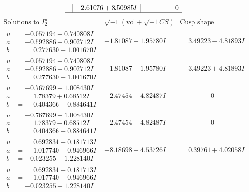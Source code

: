 \documentclass[1p]{elsarticle_modified}
\theoremstyle{definition}
\newcommand{\I}{\sqrt{-1}}
\begin{document}
$$\begin{array}{c|c|c}
 & \phantom{-}2.61076 + 8.50985 I & \phantom{-0.000000 } 0\\
 \hline 
 \end{array}$$\newpage$$\begin{array}{c|c|c}  
\text{Solutions to }I^u_{2}& \I (\text{vol} + \sqrt{-1}CS) & \text{Cusp shape}\\
 \hline 
\begin{aligned}
u &= -0.057194 + 0.740808 I \\
a &= -0.592886 - 0.902712 I \\
b &= \phantom{-}0.277630 + 1.001670 I\end{aligned}
 & -1.81087 + 1.95780 I & \phantom{-}3.49223 - 4.81893 I \\ \hline\begin{aligned}
u &= -0.057194 - 0.740808 I \\
a &= -0.592886 + 0.902712 I \\
b &= \phantom{-}0.277630 - 1.001670 I\end{aligned}
 & -1.81087 - 1.95780 I & \phantom{-}3.49223 + 4.81893 I \\ \hline\begin{aligned}
u &= -0.767699 + 1.008430 I \\
a &= \phantom{-}1.78379 + 0.68512 I \\
b &= \phantom{-}0.404366 - 0.884641 I\end{aligned}
 & -2.47454 - 4.82487 I & \phantom{-0.000000 } 0 \\ \hline\begin{aligned}
u &= -0.767699 - 1.008430 I \\
a &= \phantom{-}1.78379 - 0.68512 I \\
b &= \phantom{-}0.404366 + 0.884641 I\end{aligned}
 & -2.47454 + 4.82487 I & \phantom{-0.000000 } 0 \\ \hline\begin{aligned}
u &= \phantom{-}0.692834 + 0.181713 I \\
a &= \phantom{-}1.017740 + 0.946966 I \\
b &= -0.023255 + 1.228140 I\end{aligned}
 & -8.18698 - 4.53726 I & \phantom{-}0.39761 + 4.02058 I \\ \hline\begin{aligned}
u &= \phantom{-}0.692834 - 0.181713 I \\
a &= \phantom{-}1.017740 - 0.946966 I \\
b &= -0.023255 - 1.228140 I\end{aligned}

\end{array}$$
\end{document}
